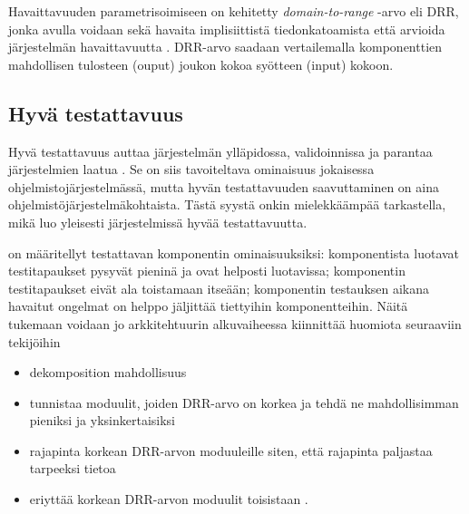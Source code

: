\documentclass[finnish]{tktltiki2}
\theoremstyle{definition}
\theoremstyle{remark}
\begin{document}
Havaittavuuden parametrisoimiseen on kehitetty \textit{domain-to-range} -arvo eli DRR, jonka avulla voidaan sekä havaita implisiittistä tiedonkatoamista \citep[s. 20-22]{Voas:1995:STN:624607.625469} että arvioida järjestelmän havaittavuutta \citep[s. 1]{Jungmayr:2002}. DRR-arvo saadaan vertailemalla komponenttien mahdollisen tulosteen (ouput) joukon kokoa syötteen (input) kokoon.  



\subsection{Hyvä testattavuus}


Hyvä testattavuus auttaa järjestelmän ylläpidossa, validoinnissa ja parantaa järjestelmien laatua \citep[s. 20]{Voas:1995:STN:624607.625469}. Se on siis tavoiteltava ominaisuus jokaisessa ohjelmistojärjestelmässä, mutta hyvän testattavuuden saavuttaminen on aina ohjelmistöjärjestelmäkohtaista. Tästä syystä onkin mielekkäämpää tarkastella, mikä luo yleisesti järjestelmissä hyvää testattavuutta. 





\citep[s. 554]{Freedman:1991:TSC:126218.126229} on määritellyt testattavan komponentin ominaisuuksiksi: komponentista luotavat testitapaukset pysyvät pieninä ja ovat helposti luotavissa; komponentin testitapaukset eivät ala toistamaan itseään; komponentin testauksen aikana havaitut ongelmat on helppo jäljittää tiettyihin komponentteihin. Näitä tukemaan voidaan jo arkkitehtuurin alkuvaiheessa kiinnittää huomiota seuraaviin tekijöihin \citep[s. 117]{voas_improving_1992} 

\begin{itemize}
	\item dekomposition mahdollisuus
	\item tunnistaa moduulit, joiden DRR-arvo on korkea ja tehdä ne mahdollisimman pieniksi ja yksinkertaisiksi
	\item rajapinta korkean DRR-arvon moduuleille siten, että rajapinta paljastaa tarpeeksi tietoa
	\item eriyttää korkean DRR-arvon moduulit toisistaan \citep[s. 23]{Voas:1995:STN:624607.625469}.
\end{itemize}
\end{document}
